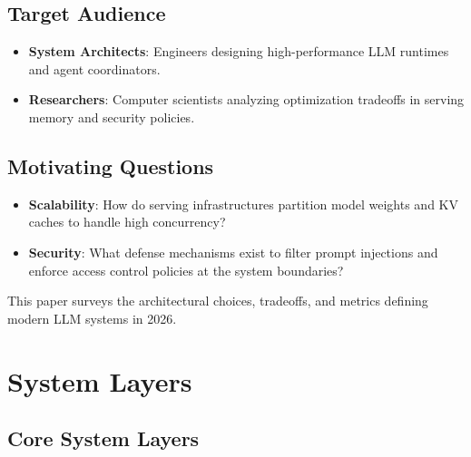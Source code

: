\documentclass[11pt]{article}
\begin{document}
\subsection{Target Audience}

\begin{itemize}
  \item \textbf{System Architects}: Engineers designing high-performance LLM runtimes and agent coordinators.
  \item \textbf{Researchers}: Computer scientists analyzing optimization tradeoffs in serving memory and security policies.
\end{itemize}

\subsection{Motivating Questions}

\begin{itemize}
  \item \textbf{Scalability}: How do serving infrastructures partition model weights and KV caches to handle high concurrency?
  \item \textbf{Security}: What defense mechanisms exist to filter prompt injections and enforce access control policies at the system boundaries?
\end{itemize}

This paper surveys the architectural choices, tradeoffs, and metrics defining modern LLM systems in 2026.

\section{System Layers}

\subsection{Core System Layers}
\end{document}
